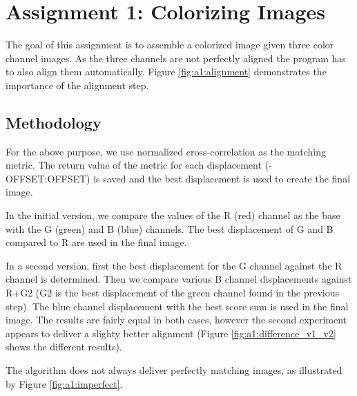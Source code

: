 \section{Assignment 1: Colorizing Images}
\label{sec:assignment1}

The goal of this assignment is to assemble a colorized image given three color channel images. As the three channels are not perfectly aligned the program has to also align them automatically. Figure \ref{fig:a1:alignment} demonstrates the importance of the alignment step.


\subsection{Methodology}

For the above purpose, we use normalized cross-correlation as the matching metric. The return value of the metric for each displacement (-OFFSET:OFFSET) is saved and the best displacement is used to create the final image.

In the initial version, we compare the values of the R (red) channel as the base with the G (green) and B (blue) channels. The best displacement of G and B compared to R are used in the final image.

In a second version, first the best displacement for the G channel against the R channel is determined. Then we compare various B channel displacements against R+G2 (G2 is the best displacement of the green channel found in the previous step). The blue channel displacement with the best score sum is used in the final image.
The results are fairly equal in both cases, however the second experiment appears to deliver a slighty better alignment
(Figure \ref{fig:a1:difference_v1_v2} shows the different results).

The algorithm does not always deliver perfectly matching images, as illustrated by Figure \ref{fig:a1:imperfect}.

